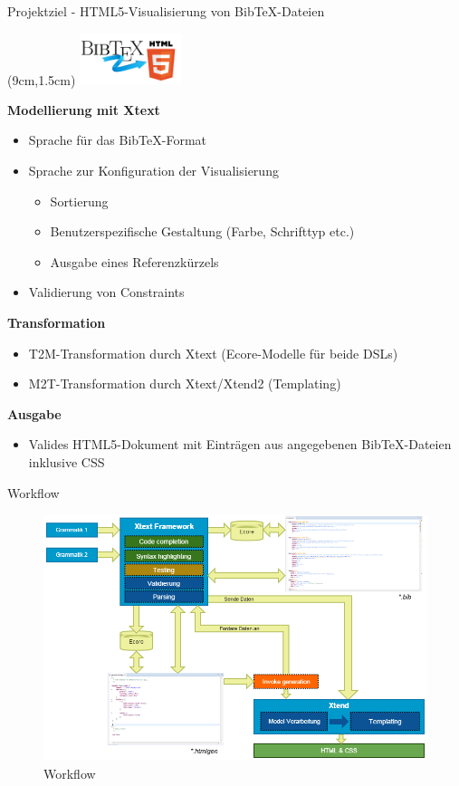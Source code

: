\documentclass[fleqn,11pt,aspectratio=43]{beamer}
\begin{document}
{
\begin{frame}{Projektziel - HTML5-Visualisierung von BibTeX-Dateien\strut}
\begin{textblock*}{3cm}(9cm,1.5cm) %
\includegraphics[width=3cm]{../logo.png}
\end{textblock*}
\textbf{Modellierung mit Xtext}
\begin{itemize}
\item Sprache für das BibTeX-Format
\item Sprache zur Konfiguration der Visualisierung 
\begin{itemize}
\item Sortierung
\item Benutzerspezifische Gestaltung (Farbe, Schrifttyp etc.)
\item Ausgabe eines Referenzkürzels
\end{itemize}
\item Validierung von Constraints
\end{itemize}

\textbf{Transformation }
\begin{itemize}
\item T2M-Transformation durch Xtext (Ecore-Modelle für beide DSLs)
\item M2T-Transformation durch Xtext/Xtend2 (Templating)
\end{itemize}

\textbf{Ausgabe}
\begin{itemize}
\item Valides HTML5-Dokument mit Einträgen aus angegebenen BibTeX-Dateien inklusive CSS
\end{itemize} 
\end{frame}
}

\begin{frame}{Workflow}
\begin{figure}
\includegraphics[scale=0.3]{../xtext_workflow.png} 
\caption{Workflow}
\end{figure}
\end{frame}
\end{document}
